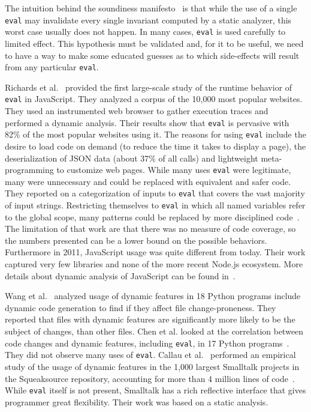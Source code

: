 \documentclass[USenglish,cleveref, autoref, thm-restate]{lipics-v2019}
\newcommand{\eval}{\texttt{eval}\xspace}
\begin{document}
The intuition behind the soundiness manifesto~\cite{soundy} is that while
the use of a single \eval may invalidate every single invariant computed by
a static analyzer, this worst case usually does not happen.  In many cases,
\eval is used carefully to limited effect. This hypothesis must be validated
and, for it to be useful, we need to have a way to make some educated
guesses as to which side-effects will result from any particular \eval.

Richards et al.~\cite{ecoop11} provided the first large-scale study of the
runtime behavior of \eval in JavaScript. They analyzed a corpus of the
10,000 most popular websites. They used an instrumented web browser to
gather execution traces and performed a dynamic analysis.  Their results show
that \eval is pervasive with 82\% of the most popular websites using it. The
reasons for using \eval include the desire to load code on demand (to reduce
the time it takes to display a page), the deserialization of JSON data
(about 37\% of all calls) and lightweight meta-programming to customize web
pages.  While many uses \eval were legitimate, many were unnecessary and
could be replaced with equivalent and safer code.  They reported on a
categorization of inputs to \eval that covers the vast majority of input
strings.  Restricting themselves to \eval in which all named variables refer
to the global scope, many patterns could be replaced by more disciplined
code~\cite{oopsla12b}.  The limitation of that work are that there was no
measure of code coverage, so the numbers presented can be a lower bound on
the possible behaviors.  Furthermore in 2011, JavaScript usage was quite
different from today. Their work captured very few libraries and none of the
more recent Node.js ecosystem.  More details about dynamic analysis of
JavaScript can be found in~\cite{liang}.

Wang et al.~\cite{wang} analyzed usage of dynamic features in 18 Python
programs include dynamic code generation to find if they affect file
change-proneness.  They reported that files with dynamic features are
significantly more likely to be the subject of changes, than other files.
Chen et al. looked at the correlation between code changes and dynamic
features, including \eval, in 17 Python programs~\cite{chen}. They did not
observe many uses of \eval.  Callau et al.~\cite{oscar} performed an empirical study of
the usage of dynamic features in the 1,000 largest Smalltalk projects in the
Squeaksource repository, accounting for more than 4 million lines of
code~\cite{oscar}. While \eval itself is not present, Smalltalk has a rich
reflective interface that gives programmer great flexibility. Their work was
based on a static analysis.
\end{document}
